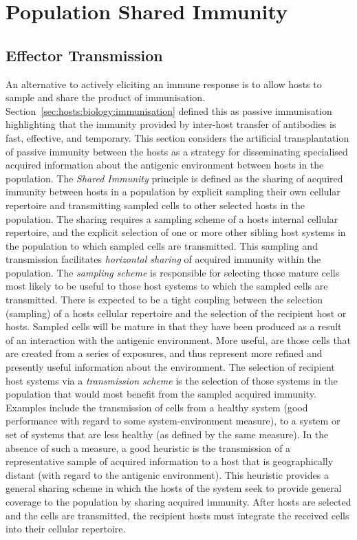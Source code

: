 %
%
\section{Population Shared Immunity}
\label{sec:hosts:population:shared}

%
%
\subsection{Effector Transmission}
An alternative to actively eliciting an immune response is to allow hosts to sample and share the product of immunisation. 
Section~\ref{sec:hosts:biology:immunisation} defined this as passive immunisation highlighting that the immunity provided by inter-host transfer of antibodies is fast, effective, and temporary. This section considers the artificial transplantation of passive immunity between the hosts as a strategy for disseminating specialised acquired information about the antigenic environment between hosts in the population.
The \emph{Shared Immunity} principle is defined as the sharing of acquired immunity between hosts in a population by explicit sampling their own cellular repertoire and transmitting sampled cells to other selected hosts in the population. The sharing requires a sampling scheme of a hosts internal cellular repertoire, and the explicit selection of one or more other sibling host systems in the population to which sampled cells are transmitted. This sampling and transmission facilitates \emph{horizontal sharing} of acquired immunity within the population. The \emph{sampling scheme} is responsible for selecting those mature cells most likely to be useful to those host systems to which the sampled cells are transmitted. There is expected to be a tight coupling between the selection (sampling) of a hosts cellular repertoire and the selection of the recipient host or hosts. Sampled cells will be mature in that they have been produced as a result of an interaction with the antigenic environment. More useful, are those cells that are created from a series of exposures, and thus represent more refined and presently useful information about the environment. The selection of recipient host systems via a \emph{transmission scheme} is the selection of those systems in the population that would most benefit from the sampled acquired immunity. Examples include the transmission of cells from a healthy system (good performance with regard to some system-environment measure), to a system or set of systems that are less healthy (as defined by the same measure). In the absence of such a measure, a good heuristic is the transmission of a representative sample of acquired information to a host that is geographically distant (with regard to the antigenic environment). This heuristic provides a general sharing scheme in which the hosts of the system seek to provide general coverage to the population by sharing acquired immunity. After hosts are selected and the cells are transmitted, the recipient hosts must integrate the received cells into their cellular repertoire. 

